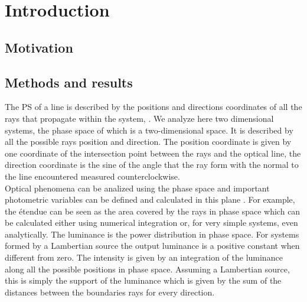 \chapter{Introduction}
\section{Motivation}
\section{Methods and results}
The PS of a line is described by the positions and directions coordinates of all the rays that propagate within the system, \cite{testorf2009phase}. We analyze here two dimensional systems, the phase space of which is a two-dimensional space. It is described by all the possible rays position and direction. The position coordinate is given by one coordinate of the intersection point between the rays and the optical line, the direction coordinate is the sine of the angle that the ray form with the normal to the line encountered measured counterclockwise. 
\\ \indent Optical phenomena can be analized using the phase space and important photometric variables can be defined and calculated in this plane \cite{rausch2014illumination}.  
For example, the \'{e}tendue can be seen as the area covered by the rays in phase space which can be calculated either using numerical integration or, for very simple systems, even analytically. The luminance is the power distribution in phase space. For systems formed by a Lambertian source the output luminance is a positive constant when different from zero. The intensity is given by an integration of the luminance along all the possible positions in phase space. Assuming a Lambertian source, this is simply the support of the luminance which is given by the sum of the distances between the boundaries rays for every direction. 

